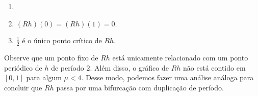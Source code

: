 \begin{proposition}
\begin{enumerate}\item[]
\item $(Rh)(0) = (Rh)(1) = 0$.
\item $\frac{1}{2}$ é o único ponto crítico de $Rh$.
\end{enumerate}
\end{proposition}

Observe que um ponto fixo de $Rh$ está unicamente relacionado com um ponto periódico de $h$ de período $2$. Além disso, o gráfico de $Rh$ não está contido em $[0, 1]$ para algum $\mu < 4$. Desse modo, podemos fazer uma análise análoga para concluir que $Rh$ passa por uma bifurcação com duplicação de período. 
